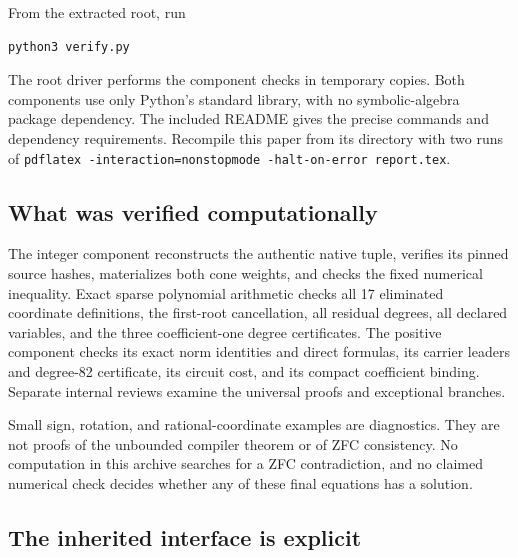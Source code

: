 \documentclass[11pt]{article}
\theoremstyle{remark}\newtheorem{remark}[theorem]{Remark}
\begin{document}
From the extracted root, run
\begin{verbatim}
python3 verify.py
\end{verbatim}
The root driver performs the component checks in temporary copies. Both components use only Python's standard library, with no symbolic-algebra package dependency. The included README gives the precise commands and dependency requirements. Recompile this paper from its directory with two runs of \texttt{pdflatex -interaction=nonstopmode -halt-on-error report.tex}.

\subsection{What was verified computationally}

The integer component reconstructs the authentic native tuple, verifies its pinned source hashes, materializes both cone weights, and checks the fixed numerical inequality. Exact sparse polynomial arithmetic checks all 17 eliminated coordinate definitions, the first-root cancellation, all residual degrees, all declared variables, and the three coefficient-one degree certificates. The positive component checks its exact norm identities and direct formulas, its carrier leaders and degree-82 certificate, its circuit cost, and its compact coefficient binding. Separate internal reviews examine the universal proofs and exceptional branches.

Small sign, rotation, and rational-coordinate examples are diagnostics. They are not proofs of the unbounded compiler theorem or of ZFC consistency. No computation in this archive searches for a ZFC contradiction, and no claimed numerical check decides whether any of these final equations has a solution.

\subsection{The inherited interface is explicit}
\end{document}
